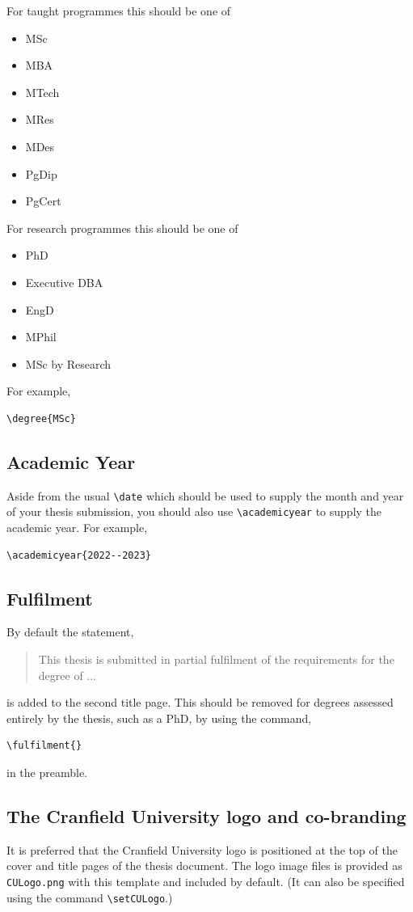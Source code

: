 \documentclass[12pt,oneside]{book} %
\begin{document}
For taught programmes \cite{cranfielduniversityTaughtDegrees2023} this should be one of 
\begin{itemize}
\item MSc
\item MBA
\item MTech
\item MRes
\item MDes
\item PgDip
\item PgCert
\end{itemize}
For research programmes \cite{cranfielduniversityResearchDegrees2023} this should be one of 
\begin{itemize}
\item PhD
\item Executive DBA
\item EngD
\item MPhil
\item MSc by Research
\end{itemize}
For example,
\begin{verbatim}
\degree{MSc}
\end{verbatim}

\subsection{Academic Year}
\label{sec:AcademicYear}
Aside from the usual \verb#\date# which should be used to supply the month and year of your thesis submission, you should also use \verb#\academicyear# to supply the academic year. For example,
\begin{verbatim} 
\academicyear{2022--2023}
\end{verbatim}



\subsection{Fulfilment}
\label{sec:Fulfilment}
By default the statement,
\begin{quote} 
This thesis is submitted in partial fulfilment of the requirements for the degree of ...
\end{quote}
is added to the second title page. This should be removed for degrees assessed entirely by the thesis, such as a PhD, by using the command,
\begin{verbatim}
\fulfilment{}
\end{verbatim}
in the preamble. 

\subsection{The Cranfield University logo and co-branding}
It is preferred that the Cranfield University logo is positioned at the top of the cover and title pages of the thesis document. The logo image files is provided as \verb#CULogo.png# with this template and included by default. (It can also be specified using the command \verb#\setCULogo#.)
\end{document}
